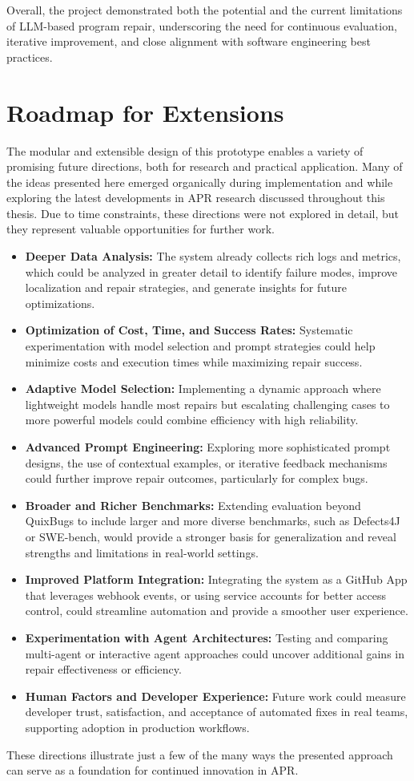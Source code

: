 Overall, the project demonstrated both the potential and the current limitations of LLM-based program repair, underscoring the need for continuous evaluation, iterative improvement, and close alignment with software engineering best practices.


\section{Roadmap for Extensions} \label{section:roadmap}
The modular and extensible design of this prototype enables a variety of promising future directions, both for research and practical application. Many of the ideas presented here emerged organically during implementation and while exploring the latest developments in \ac{APR} research discussed throughout this thesis. Due to time constraints, these directions were not explored in detail, but they represent valuable opportunities for further work.

\begin{itemize}
    \item \textbf{Deeper Data Analysis:} The system already collects rich logs and metrics, which could be analyzed in greater detail to identify failure modes, improve localization and repair strategies, and generate insights for future optimizations.
    \item \textbf{Optimization of Cost, Time, and Success Rates:} Systematic experimentation with model selection and prompt strategies could help minimize costs and execution times while maximizing repair success.
    \item \textbf{Adaptive Model Selection:} Implementing a dynamic approach where lightweight models handle most repairs but escalating challenging cases to more powerful models could combine efficiency with high reliability.
    \item \textbf{Advanced Prompt Engineering:} Exploring more sophisticated prompt designs, the use of contextual examples, or iterative feedback mechanisms could further improve repair outcomes, particularly for complex bugs.
    \item \textbf{Broader and Richer Benchmarks:} Extending evaluation beyond QuixBugs to include larger and more diverse benchmarks, such as Defects4J or SWE-bench, would provide a stronger basis for generalization and reveal strengths and limitations in real-world settings.
    \item \textbf{Improved Platform Integration:} Integrating the system as a GitHub App that leverages webhook events, or using service accounts for better access control, could streamline automation and provide a smoother user experience.
    \item \textbf{Experimentation with Agent Architectures:} Testing and comparing multi-agent or interactive agent approaches could uncover additional gains in repair effectiveness or efficiency.
    \item \textbf{Human Factors and Developer Experience:} Future work could measure developer trust, satisfaction, and acceptance of automated fixes in real teams, supporting adoption in production workflows.
\end{itemize}

These directions illustrate just a few of the many ways the presented approach can serve as a foundation for continued innovation in \acf{APR}.
